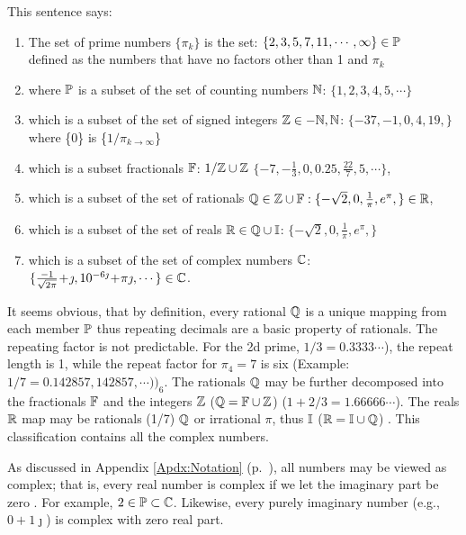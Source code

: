 \documentclass{ximera}
\begin{document}
This sentence says:
\begin{enumerate}
	\item The set of prime numbers $\{\pi_k\}$ is the set: $\{2,3,5,7,11, \cdots ,\infty\}\in\P$
\\ defined as the numbers that have no factors other than 1 and $\pi_k$
	\item where $\P$ is a subset of the set of counting numbers $\N$: $\{1,2,3,4,5,\cdots\}$ %
	\item which is a subset of the set of signed integers $\Z\in -\N, \N$: $\{-37,-1, 0, 4, 19, \}$
		\\ where \{0\} is \{$1/\pi_{k {\rightarrow\infty}}$\}
	\item which is a subset fractionals $\F$: $1/\Z \cup \Z$ $\{-7,-\frac{1}{3},0, 0.25,\frac{22}{7}, 5,\cdots\}$,
	\item which is a subset of the set of rationals $\Q\in\Z\cup\F: \{-\sqrt{2}, 0, \frac{1}{\pi}, e^\pi,\}\in\R$,
	\item which is a subset of the set of reals $\R \in \Q\cup\I$: $\{-\sqrt{2}, 0, \frac{1}{\pi}, e^\pi,\}$%
	\item which is a subset of the set of complex numbers $\C$: $\{\frac{-1}{\sqrt{2\pi}}\!+\!\jmath, 10^{-6\jmath}\!+\!\pi\jmath,\cdots\}\in\C$. 
\end{enumerate}

It seems obvious, that by definition, every rational $\Q$ is a unique mapping from each member $\P$
thus repeating decimals are a basic property of rationals.
The repeating factor is not predictable.
For the 2d prime, $1/3 = 0.3333 \cdots$), the repeat length is 1, while the repeat factor for $\pi_4=7$ is six
(Example: $1/7=0.142857,142857,\cdots))_6$.
The rationals $\Q$ may be further decomposed into the fractionals $\F$ and the integers $\Z$ ($\Q = \F \cup \Z$)
($1+2/3 = 1.66666\cdots$).
The reals $\R$ map may be rationals (1/7) $\Q$ or irrational $\pi$, thus $\I$ ($\R = \I \cup \Q$)
 \citep{HardyWright38,apostol2013}.
This classification contains all the complex numbers.

As discussed in Appendix \ref{Apdx:Notation} (p.~\pageref{Apdx:Notation}), all numbers may be viewed as
complex; that is, every real number is complex if we let the imaginary part be zero \citep{Boas87}. 
For example, $2 \in \P \subset \C$.  Likewise, every purely imaginary number (e.g., $0+1\jmath$) is
complex with zero real part. 
\end{document}
